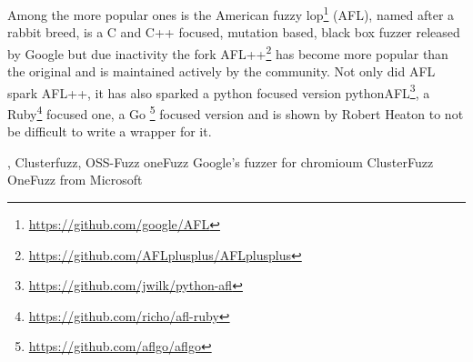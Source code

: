 Among the more popular ones is the American fuzzy lop\footnote{\url{https://github.com/google/AFL}} (AFL), named after a rabbit breed, is a C and C++ focused, mutation based, black box fuzzer released by Google but due inactivity the fork AFL++\cite{27AFL++}\footnote{\url{https://github.com/AFLplusplus/AFLplusplus}} has become more popular than the original and is maintained actively by the community. Not only did AFL spark AFL++, it has also sparked a python focused version pythonAFL\footnote{\url{https://github.com/jwilk/python-afl}}, a  Ruby\footnote{\url{https://github.com/richo/afl-ruby}} focused one,  a Go \footnote{\url{https://github.com/aflgo/aflgo}} focused version and is shown by Robert Heaton\cite{AFLWrapper} to not be difficult to write a wrapper for it.

, Clusterfuzz\cite{clusterfuzzGithub}, OSS-Fuzz\cite{OSS-fuzzGithub} oneFuzz
Google's fuzzer for chromioum ClusterFuzz
OneFuzz from Microsoft 



